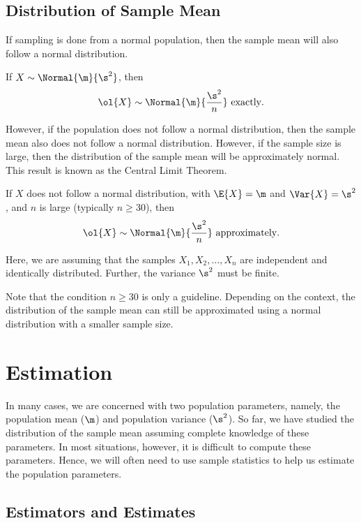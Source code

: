 \subsection{Distribution of Sample Mean}

If sampling is done from a normal population, then the sample mean will also follow a normal distribution.

\begin{proposition}
    If $X \sim \Normal{\m}{\s^2}$, then \[\ol{X} \sim \Normal{\m}{\frac{\s^2}{n}} \text{ exactly}.\]
\end{proposition}

However, if the population does not follow a normal distribution, then the sample mean also does not follow a normal distribution. However, if the sample size is large, then the distribution of the sample mean will be approximately normal. This result is known as the Central Limit Theorem.

\begin{theorem}
    If $X$ does not follow a normal distribution, with $\E{X} = \m$ and $\Var{X} = \s^2$, and $n$ is large (typically $n \geq 30$), then \[\ol{X} \sim \Normal{\m}{\frac{\s^2}{n}} \text{ approximately}.\]
\end{theorem}

Here, we are assuming that the samples $X_1, X_2, \dots, X_n$ are independent and identically distributed. Further, the variance $\s^2$ must be finite.

Note that the condition $n \geq 30$ is only a guideline. Depending on the context, the distribution of the sample mean can still be approximated using a normal distribution with a smaller sample size.

\section{Estimation}

In many cases, we are concerned with two population parameters, namely, the population mean ($\m$) and population variance ($\s^2$). So far, we have studied the distribution of the sample mean assuming complete knowledge of these parameters. In most situations, however, it is difficult to compute these parameters. Hence, we will often need to use sample statistics to help us estimate the population parameters.

\subsection{Estimators and Estimates}

